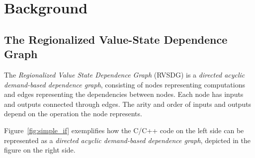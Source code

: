 
\clearpage
\section{Background}
\label{background}

\subsection{The Regionalized Value-State Dependence Graph}
\label{background:RVSDG}

The \textit{Regionalized Value State Dependence Graph}\cite{RVSDG:HiPEACpaper}
(RVSDG) is a \textit{directed acyclic demand-based dependence graph},
consisting of nodes representing computations and edges representing the
dependencies between nodes. Each node has inputs and outputs connected through
edges. The arity and order of inputs and outputs depend on the operation the
node represents.

Figure~\ref{fig:simple_if} exemplifies how the C/C++ code on the left side can
be represented as a \textit{directed acyclic demand-based dependence graph},
depicted in the figure on the right side.



